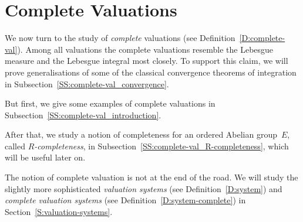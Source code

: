 \documentclass[main.tex]{subfiles}
\begin{document}
%
%
%
%
%
\section{Complete Valuations}
\label{S:complete-val}
\noindent
We now turn to the study of \emph{complete} valuations
(see Definition~\ref{D:complete-val}).
Among all valuations
the complete valuations resemble
the Lebesgue measure
and the Lebesgue integral most closely.
To support this claim,
we will
prove generalisations of
some of the classical convergence theorems of integration
in Subsection~\ref{SS:complete-val_convergence}.

But first, we give some examples of complete valuations
in Subsection~\ref{SS:complete-val_introduction}.

After that,
we  study a notion of completeness
for an ordered Abelian group~$E$,
called \emph{$R$-completeness},
in Subsection~\ref{SS:complete-val_R-completeness},
which will be useful later on.

The notion of complete valuation is not at the end of the 
road.  We will study the
slightly more sophisticated 
\emph{valuation systems}
(see Definition~\ref{D:system})
and \emph{complete valuation systems}
(see Definition~\ref{D:system-complete})
in Section~\ref{S:valuation-systems}.

%
%
\end{document}
